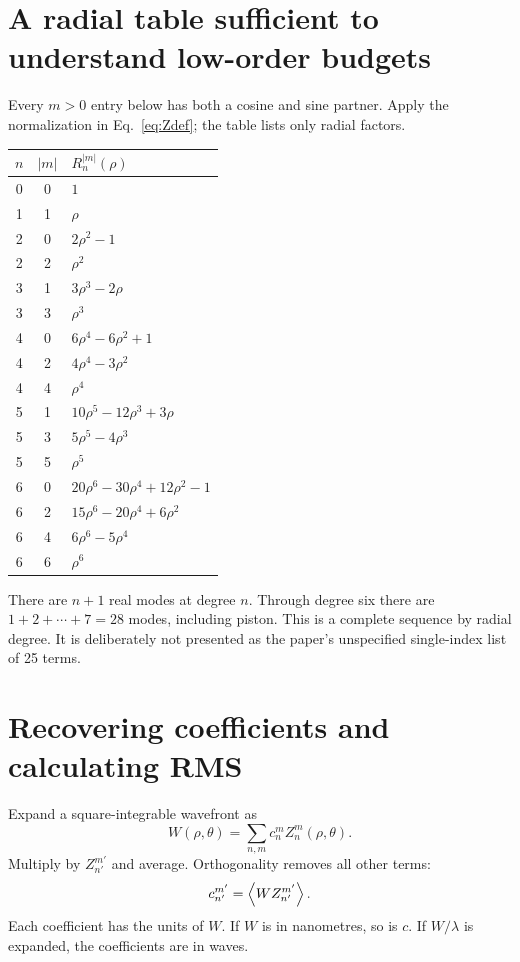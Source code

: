 \section{A radial table sufficient to understand low-order budgets}
Every $m>0$ entry below has both a cosine and sine partner. Apply the
normalization in Eq.~\eqref{eq:Zdef}; the table lists only radial factors.
\begin{longtable}{@{}ccp{}@{}}
\toprule $n$ & $|m|$ & $R_n^{|m|}(\rho)$\\ \midrule\endhead
0&0&$1$\\
1&1&$\rho$\\
2&0&$2\rho^2-1$\\
2&2&$\rho^2$\\
3&1&$3\rho^3-2\rho$\\
3&3&$\rho^3$\\
4&0&$6\rho^4-6\rho^2+1$\\
4&2&$4\rho^4-3\rho^2$\\
4&4&$\rho^4$\\
5&1&$10\rho^5-12\rho^3+3\rho$\\
5&3&$5\rho^5-4\rho^3$\\
5&5&$\rho^5$\\
6&0&$20\rho^6-30\rho^4+12\rho^2-1$\\
6&2&$15\rho^6-20\rho^4+6\rho^2$\\
6&4&$6\rho^6-5\rho^4$\\
6&6&$\rho^6$\\
\bottomrule
\end{longtable}
There are $n+1$ real modes at degree $n$. Through degree six there are
$1+2+\cdots+7=28$ modes, including piston.
This is a complete sequence by radial degree.
It is deliberately not presented as the paper's unspecified single-index
list of 25 terms.


\section{Recovering coefficients and calculating RMS}
Expand a square-integrable wavefront as
\begin{equation}
W(\rho,\theta)=\sum_{n,m}c_n^mZ_n^m(\rho,\theta).
\end{equation}
Multiply by $Z_{n'}^{m'}$ and average. Orthogonality removes all other
terms:
\begin{equation}
c_{n'}^{m'}=\left\langle WZ_{n'}^{m'}\right\rangle.
\label{eq:projection}
\end{equation}
Each coefficient has the units of $W$. If $W$ is in nanometres, so is $c$.
If $W/\lambda$ is expanded, the coefficients are in waves.

